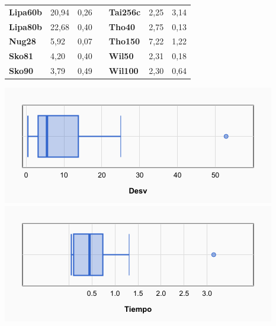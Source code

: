 \documentclass[a4paper, 12pt]{article}
\begin{document}
\begin{table}[H]
\begin{tabular}{|l|l|l|l|l|l|l|}
\textbf{Lipa60b}                    & 20,94                              & 0,26                                 &                                & \textbf{Tai256c}                   & 2,25                               & 3,14                                 \\ \cline{1-3} \cline{5-7} 
\textbf{Lipa80b}                    & 22,68                              & 0,40                                 &                                & \textbf{Tho40}                     & 2,75                               & 0,13                                 \\ \cline{1-3} \cline{5-7} 
\textbf{Nug28}                      & 5,92                               & 0,07                                 &                                & \textbf{Tho150}                    & 7,22                               & 1,22                                 \\ \cline{1-3} \cline{5-7} 
\textbf{Sko81}                      & 4,20                               & 0,40                                 &                                & \textbf{Wil50}                     & 2,31                               & 0,18                                 \\ \cline{1-3} \cline{5-7} 
\textbf{Sko90}                      & 3,79                               & 0,49                                 &                                & \textbf{Wil100}                    & 2,30                               & 0,64                                 \\ \cline{1-3} \cline{5-7} 
\end{tabular}
\end{table}

	\begin{center}
         \includegraphics[scale=0.42]{boxplot-aggpos-desv}
         \includegraphics[scale=0.42]{boxplot-aggpos-time}
      \end{center}
\end{document}
